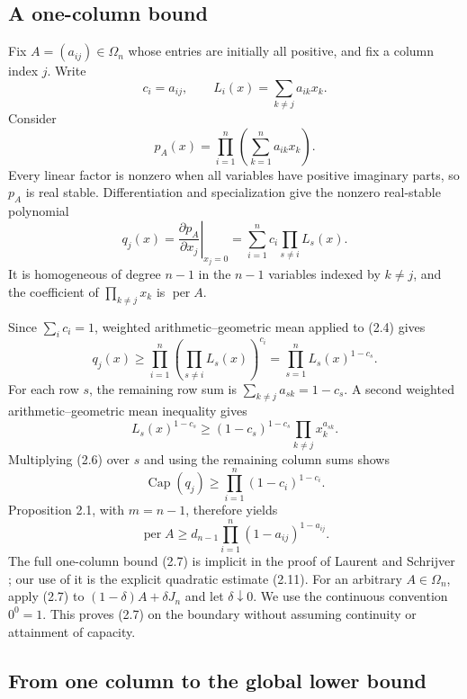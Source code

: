 \documentclass[11pt]{article}
\begin{document}
\subsection{A one-column bound}

Fix $A=(a_{ij})\in\Omega_n$ whose entries are initially all positive, and
fix a column index $j$. Write
\[
c_i=a_{ij},
\qquad
L_i(x)=\sum_{k\ne j}a_{ik}x_k.
\]
Consider
\[
p_A(x)=\prod_{i=1}^n\left(\sum_{k=1}^n a_{ik}x_k\right).
\]
Every linear factor is nonzero when all variables have positive imaginary
parts, so $p_A$ is real stable. Differentiation and specialization give the
nonzero real-stable polynomial
\[
q_j(x)=\left.\frac{\partial p_A}{\partial x_j}\right|_{x_j=0}
=\sum_{i=1}^n c_i\prod_{s\ne i}L_s(x).
\tag{2.4}
\]
It is homogeneous of degree $n-1$ in the $n-1$ variables indexed by
$k\ne j$, and the coefficient of $\prod_{k\ne j}x_k$ is
$\operatorname{per}A$.

Since $\sum_i c_i=1$, weighted arithmetic--geometric mean applied to (2.4)
gives
\[
q_j(x)\ge
\prod_{i=1}^n\left(\prod_{s\ne i}L_s(x)\right)^{c_i}
=\prod_{s=1}^n L_s(x)^{1-c_s}.
\tag{2.5}
\]
For each row $s$, the remaining row sum is
$\sum_{k\ne j}a_{sk}=1-c_s$. A second weighted arithmetic--geometric mean
inequality gives
\[
L_s(x)^{1-c_s}
\ge(1-c_s)^{1-c_s}\prod_{k\ne j}x_k^{a_{sk}}.
\tag{2.6}
\]
Multiplying (2.6) over $s$ and using the remaining column sums shows
\[
\operatorname{Cap}(q_j)\ge\prod_{i=1}^n(1-c_i)^{1-c_i}.
\]
Proposition 2.1, with $m=n-1$, therefore yields
\[
\operatorname{per}A\ge
d_{n-1}\prod_{i=1}^n(1-a_{ij})^{1-a_{ij}}.
\tag{2.7}
\]
The full one-column bound (2.7) is implicit in the proof of
Laurent and Schrijver \cite[proof of Corollary~1d, equation~(39)]{ref11}; our use of it is the
explicit quadratic estimate (2.11). For an arbitrary
$A\in\Omega_n$, apply (2.7) to $(1-\delta)A+\delta J_n$ and let
$\delta\downarrow0$. We use the continuous convention $0^0=1$. This proves
(2.7) on the boundary without assuming continuity or attainment of capacity.

\subsection{From one column to the global lower bound}
\end{document}
